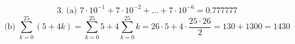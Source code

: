 \documentclass{article}
\begin{document}
\[
\text{3. (a) } 7 \cdot 10^{-1} + 7 \cdot 10^{-2} + \dots + 7 \cdot 10^{-6} = 0.777777
\]
\[
\text{(b) } \sum_{k=0}^{25} (5+4k) = \sum_{k=0}^{25} 5 + 4\sum_{k=0}^{25} k = 26 \cdot 5 + 4 \cdot \frac{25 \cdot 26}{2} = 130 + 1300 = 1430
\]
\end{document}
